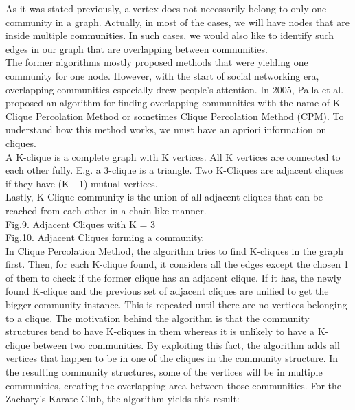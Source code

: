 \documentclass[10pt]{article}
\begin{document}
As it was stated previously, a vertex does not necessarily belong to only one community in a graph. Actually, in most of the cases, we will have nodes that are inside multiple communities. In such cases, we would also like to identify such edges in our graph that are overlapping between communities. \\

The former algorithms mostly proposed methods that were yielding one community for one node. However, with the start of social networking era, overlapping communities especially drew people’s attention. In 2005, Palla et al. proposed an algorithm for finding overlapping communities with the name of K-Clique Percolation Method or sometimes Clique Percolation Method (CPM). To understand how this method works, we must have an apriori information on cliques. \\

A K-clique is a complete graph with K vertices. All K vertices are connected to each other fully. E.g. a 3-clique is a triangle.
Two K-Cliques are adjacent cliques if they have (K - 1) mutual vertices. \\

Lastly, K-Clique community is the union of all adjacent cliques that can be reached from each other in a chain-like manner. \\

Fig.9. Adjacent Cliques with K = 3 \\

Fig.10. Adjacent Cliques forming a community. \\

In Clique Percolation Method, the algorithm tries to find K-cliques in the graph first. Then, for each K-clique found, it considers all the edges except the chosen 1 of them to check if the former clique has an adjacent clique. If it has, the newly found K-clique and the previous set of adjacent cliques are unified to get the bigger community instance. This is repeated until there are no vertices belonging to a clique\cite{eleven}.
The motivation behind the algorithm is that the community structures tend to have K-cliques in them whereas it is unlikely to have a K-clique between two communities. By exploiting this fact, the algorithm adds all vertices that happen to be in one of the cliques in the community structure. In the resulting community structures, some of the vertices will be in multiple communities, creating the overlapping area between those communities. For the Zachary’s Karate Club, the algorithm yields this result: \\
\end{document}
